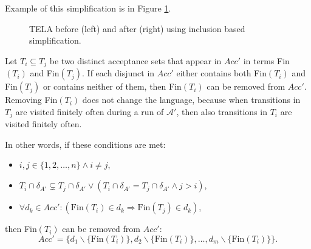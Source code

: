 \documentclass[
  digital, %
  twoside, %
  table,   %
  lof,     %
  lot,     %
]{fithesis3}
\begin{document}
Example of this simplification is in Figure \ref{fig:inclusion_infs}.

\begin{figure}[h]
  \centering
  \caption{TELA before (left) and after (right) using inclusion based simplification.}
  \label{fig:inclusion_infs}
\end{figure}

Let $T_i \subseteq T_j$ be two distinct acceptance sets that appear in $Acc'$ in terms Fin$(T_i)$ and Fin$(T_j)$. If each disjunct in $Acc'$ either contains both Fin$(T_i)$ and Fin$(T_j)$ or contains neither of them, then Fin$(T_i)$ can be removed from $Acc'$.  Removing Fin$(T_i)$ does not change the language, because when transitions in $T_j$ are visited finitely often during a run of $\mathcal{A'}$, then also transitions in $T_i$ are visited finitely often. 

In other words, if these conditions are met:
\begin{itemize}
  \item $i, j \in \{1,2, \dots, n\} \wedge i \neq j$,
  \item $T_i \cap \delta_{A'} \subsetneq T_j \cap \delta_{A'} \vee (T_i \cap \delta_{A'} = T_j \cap \delta_{A'} \wedge j > i)$,
  \item $\forall d_k \in Acc' \colon (\text{Fin}(T_i) \in d_k \Rightarrow \text{Fin}(T_j) \in d_k)$,
\end{itemize}
then Fin$(T_i)$ can be removed from $Acc'$:
\begin{equation*}
  Acc' = \{d_1 \smallsetminus \{\text{Fin}(T_i)\}, d_2 \smallsetminus \{\text{Fin}(T_i)\}, \dots, d_m \smallsetminus \{\text{Fin}(T_i)\}\}.
\end{equation*}
\end{document}
